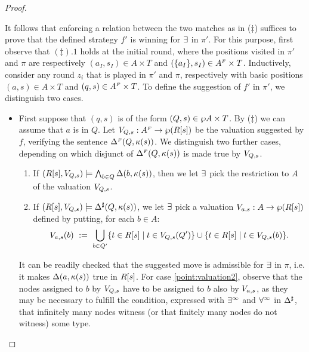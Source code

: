 \begin{proof}
\begin{enumerate}[(i)]
It follows that enforcing a relation between the two matches as in ($\ddag$) suffices to prove that the defined strategy $f'$ is winning for $\exists$ in $\pi'$. For this purpose, first observe that $(\ddag).1$ holds at the initial round, where the positions visited in $\pi'$ and $\pi$ are respectively $(a_I,s_I) \in A \times T$ and $(\{a_I\},s_I) \in A^{{\scriptscriptstyle F}} \times T$. Inductively, consider any round $z_i$ that is played in $\pi'$ and $\pi$, respectively with basic positions $(a,s) \in A \times T$ and $(q,s) \in A^{{\scriptscriptstyle F}} \times T$. To define the suggestion of $f'$ in $\pi'$, we distinguish two cases.
\begin{itemize}
  \item First suppose that $(q,s)$ is of the form $(Q,s) \in
  \wp A\times T$. By ($\ddag$) we can assume that $a$ is in $Q$. Let $V_{Q,s} :A^{{\scriptscriptstyle F}} \rightarrow \wp(R[s])$ be the valuation suggested by $f$, verifying the sentence $\Delta^{{\scriptscriptstyle F}}(Q,\kappa(s))$. We distinguish two further cases, depending on which disjunct of $\Delta^{{\scriptscriptstyle F}}(Q,\kappa(s))$ is made true by $V_{Q,s}$.
      \begin{enumerate}[label=(\roman*), ref=\roman*]
        \item If $(R[s],V_{Q,s})\models \bigwedge_{b \in Q} \Delta(b,\kappa(s))$, then we let $\exists$ pick the restriction to $A$ of the valuation $V_{Q,s}$. \label{point:valuation1}
        \item If $(R[s],V_{Q,s})\models \Delta^{\sharp}(Q,\kappa(s))$, we let $\exists$ pick a valuation $V_{a,s}:A \rightarrow \wp (R[s])$ defined by putting, for each $b \in A$:
            \begin{align*}
               V_{a,s}(b)\ :=\ \bigcup_{b \in Q'} \{t \in R[s] \mid t \in V_{Q,s}(Q')\}
               \cup  \{t \in R[s] \mid t \in V_{Q,s}(b)\} .
            \end{align*} \label{point:valuation2}
      \end{enumerate}
      It can be readily checked that the suggested move is admissible for $\exists$ in $\pi$, i.e. it makes $\Delta(a,\kappa(s))$ true in $R[s]$. For case \eqref{point:valuation2}, observe that the nodes assigned to $b$ by $V_{Q,s}$ have to be assigned to $b$ also by $V_{a,s}$, as they may be necessary to fulfill the condition, expressed with $\exists^\infty$ and $\forall^\infty$ in $\Delta^{\sharp}$, that infinitely many nodes witness (or that finitely many nodes do not witness) some type.


\end{itemize}
\end{enumerate}
\end{proof}
